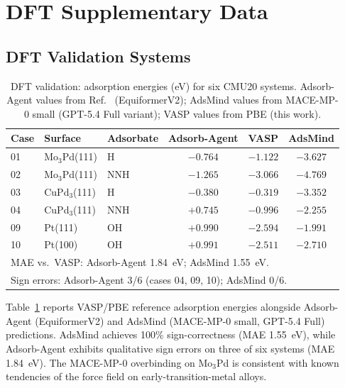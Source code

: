 \documentclass[%
 preprint,
 superscriptaddress,
 amsmath,amssymb,
 aps,
 prb,
 floatfix,
]{revtex4-2}
\begin{document}




\section{DFT Supplementary Data}

\subsection{DFT Validation Systems}

\begin{table}[ht]
\centering
\caption{DFT validation: adsorption energies (eV) for six CMU20 systems. Adsorb-Agent values from Ref.~ (EquiformerV2); AdsMind values from MACE-MP-0 small (GPT-5.4 Full variant); VASP values from PBE (this work).}
\label{tab:si-dft-systems}
\begin{tabular}{lllccc}
\toprule
Case & Surface & Adsorbate & Adsorb-Agent & VASP & AdsMind \\
\midrule
01 & Mo$_3$Pd(111) & H & $-0.764$ & $-1.122$ & $-3.627$ \\
02 & Mo$_3$Pd(111) & NNH & $-1.265$ & $-3.066$ & $-4.769$ \\
03 & CuPd$_3$(111) & H & $-0.380$ & $-0.319$ & $-3.352$ \\
04 & CuPd$_3$(111) & NNH & $+0.745$ & $-0.996$ & $-2.255$ \\
09 & Pt(111) & OH & $+0.990$ & $-2.594$ & $-1.991$ \\
10 & Pt(100) & OH & $+0.991$ & $-2.511$ & $-2.710$ \\
\midrule
\multicolumn{6}{l}{MAE vs.\ VASP: Adsorb-Agent 1.84~eV; AdsMind 1.55~eV. } \\
\multicolumn{6}{l}{Sign errors: Adsorb-Agent 3/6 (cases 04, 09, 10); AdsMind 0/6.}\\
\bottomrule
\end{tabular}
\end{table}

Table~\ref{tab:si-dft-systems} reports VASP/PBE reference adsorption energies alongside Adsorb-Agent (EquiformerV2) and AdsMind (MACE-MP-0 small, GPT-5.4 Full) predictions. AdsMind achieves 100\% sign-correctness (MAE 1.55~eV), while Adsorb-Agent exhibits qualitative sign errors on three of six systems (MAE 1.84~eV). The MACE-MP-0 overbinding on Mo$_3$Pd is consistent with known tendencies of the force field on early-transition-metal alloys.
\end{document}
